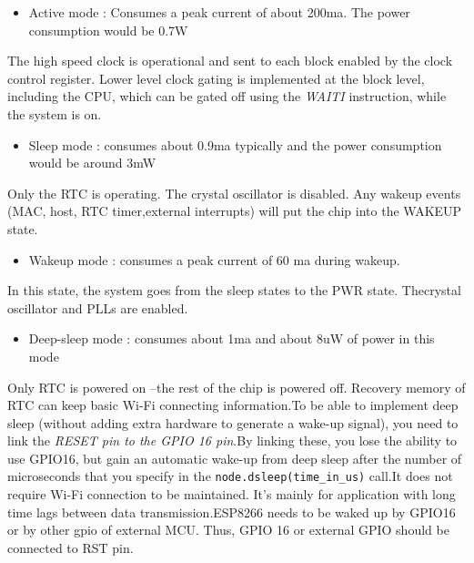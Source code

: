 \documentclass[16pt]{article}
\begin{document}
\begin{itemize}

\item
  Active mode : Consumes a peak current of about 200ma. The power
  consumption would be 0.7W
\end{itemize}

The high speed clock is operational and sent to each block enabled by
the clock control register. Lower level clock gating is implemented at
the block level, including the CPU, which can be gated off using the
\emph{WAITI} instruction, while the system is on.

\begin{itemize}

\item
  Sleep mode : consumes about 0.9ma typically and the power consumption
  would be around 3mW
\end{itemize}

Only the RTC is operating. The crystal oscillator is disabled. Any
wakeup events (MAC, host, RTC timer,external interrupts) will put the
chip into the WAKEUP state.

\begin{itemize}

\item
  Wakeup mode : consumes a peak current of 60 ma during wakeup.
\end{itemize}

In this state, the system goes from the sleep states to the PWR state.
Thecrystal oscillator and PLLs are enabled.

\begin{itemize}

\item
  Deep-sleep mode : consumes about 1ma and about 8uW of power in this
  mode
\end{itemize}

Only RTC is powered on --the rest of the chip is powered off. Recovery
memory of RTC can keep basic Wi-Fi connecting information.To be able to implement deep sleep (without adding extra hardware to
generate a wake-up signal), you need to link the \emph{RESET pin to the
GPIO 16 pin}.By linking these, you lose the ability to use GPIO16, but
gain an automatic wake-up from deep sleep after the number of
microseconds that you specify in the \texttt{node.dsleep(time\_in\_us)}
call.It does not require Wi-Fi connection to be maintained. It's mainly for
application with long time lags between data transmission.ESP8266 needs to be waked up by GPIO16 or by other gpio of external MCU.
Thus, GPIO 16 or external GPIO should be connected to RST pin.
\end{document}
